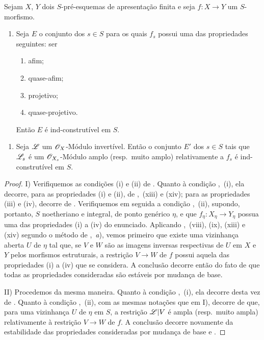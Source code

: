 \begin{proposition}[9.6.2]
\label{IV.9.6.2}
Sejam $X$, $Y$ dois $S$-pré-esquemas de apresentação finita e seja $f:X\to Y$ um $S$-morfismo.
\begin{enumerate}[label=\upshape{I)}]
  \item Seja $E$ o conjunto dos $s\in S$ para os quais $f_s$ possui uma das propriedades seguintes: ser
  \begin{enumerate}[label=(\roman*)]
    \item afim;
    \item quase-afim;
    \item projetivo;
    \item quase-projetivo.
  \end{enumerate}
  Então $E$ é ind-construtível em $S$.
\end{enumerate}


\begin{enumerate}[label=\upshape{II)}]
  \item Seja $\mathscr{L}$ um $\mathscr{O}_X$-Módulo invertível.
  Então o conjunto $E'$ dos $s\in S$ tais que $\mathscr{L}_s$ é um $\mathscr{O}_{X_s}$-Módulo amplo (resp.\ muito amplo) relativamente a $f_s$ é ind-construtível em $S$.
\end{enumerate}
\end{proposition}

\begin{proof}
I) Verifiquemos as condições (i) e (ii) de .
Quanto à condição ,~(i), ela decorre, para as propriedades (i) e (ii), de ,~(xiii) e (xiv); para as propriedades (iii) e (iv), decorre de .
Verifiquemos em seguida a condição ,~(ii), supondo, portanto, $S$ noetheriano e integral, de ponto genérico $\eta$, e que $f_\eta:X_\eta\to Y_\eta$ possua uma das propriedades (i) a (iv) do enunciado.
Aplicando ,~(viii), (ix), (xiii) e (xiv) segundo o método de ,~\emph{a}), vemos primeiro que existe uma vizinhança aberta $U$ de $\eta$ tal que, se $V$ e $W$ são as imagens inversas respectivas de $U$ em $X$ e $Y$ pelos morfismos estruturais, a restrição $V\to W$ de $f$ possui aquela das propriedades (i) a (iv) que se considera.
A conclusão decorre então do fato de que todas as propriedades consideradas são estáveis por mudança de base.

II) Procedemos da mesma maneira.
Quanto à condição ,~(i), ela decorre desta vez de .
Quanto à condição ,~(ii), com as mesmas notações que em I), decorre de  que, para uma vizinhança $U$ de $\eta$ em $S$, a restrição $\mathscr{L}|V$ é ampla (resp.\ muito ampla) relativamente à restrição $V\to W$ de $f$.
A conclusão decorre novamente da estabilidade das propriedades consideradas por mudança de base  e .
\end{proof}

